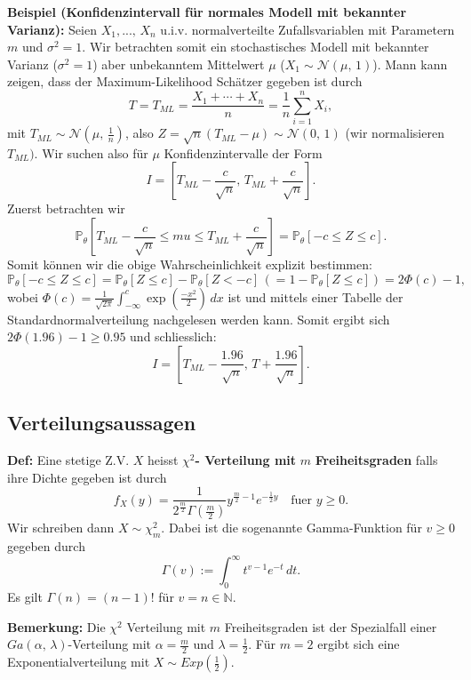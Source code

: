 \documentclass[a4paper]{extarticle}
\begin{document}
\begin{ebox}
    \textbf{Beispiel (Konfidenzintervall für normales Modell mit bekannter Varianz):} Seien $X_1,..., \, X_n$ u.i.v. normalverteilte Zufallsvariablen mit Parametern $m$ und $\sigma^2 = 1.$ Wir betrachten somit ein stochastisches Modell mit bekannter Varianz ($\sigma^2 = 1$) aber unbekanntem Mittelwert $\mu$ ($X_1 \sim \mathcal{N}(\mu, \, 1)$). Mann kann zeigen, dass der Maximum-Likelihood Schätzer gegeben ist durch
    \[
        T = T_{ML} = \frac{X_1 + \cdots + X_n}{n} = \frac{1}{n} \sum_{i = 1}^n X_i,
    \]
    mit $T_{ML} \sim \mathcal{N} (\mu, \, \frac{1}{n})$, also $Z = \sqrt{n}(T_{ML} - \mu) \sim \mathcal{N}(0, \, 1)$ (wir normalisieren $T_{ML})$. Wir suchen also für $\mu$ Konfidenzintervalle der Form
    \[
        I = [T_{ML} - \frac{c}{\sqrt{n}}, \, T_{ML} + \frac{c}{\sqrt{n}}].
    \]
    Zuerst betrachten wir
    \[
        \mathbb{P}_{\theta}[T_{ML} - \frac{c}{\sqrt{n}} \leq mu \leq T_{ML} + \frac{c}{\sqrt{n}}] = \mathbb{P}_{\theta}[-c \leq Z \leq c].
    \]
    Somit können wir die obige Wahrscheinlichkeit explizit bestimmen:
    \[
        \mathbb{P}_{\theta}[-c \leq Z \leq c] = \mathbb{P}_{\theta}[Z \leq c] - \mathbb{P}_{\theta}[Z < -c] \, (= 1 - \mathbb{P}_{\theta}[Z \leq c]) = 2 \Phi(c) - 1,
    \]
    wobei $\Phi(c) = \frac{1}{\sqrt{2 \pi}}\int_{- \infty}^c \exp(\frac{-x^2}{2}) \, dx$ ist und mittels einer Tabelle der Standardnormalverteilung nachgelesen werden kann. Somit ergibt sich $2 \Phi(1.96) - 1 \geq 0.95$ und schliesslich:
    \[
        I = [T_{ML} - \frac{1.96}{\sqrt{n}}, \, T + \frac{1.96}{\sqrt{n}}].
    \]
\end{ebox}

\subsection{Verteilungsaussagen}

\textbf{Def:} Eine stetige Z.V. $X$ heisst $\chi^2$\textbf{- Verteilung mit} $m$ \textbf{Freiheitsgraden} falls ihre Dichte gegeben ist durch
\[
    f_X(y) = \frac{1}{2^{\frac{m}{2}}\Gamma(\frac{m}{2})}y^{\frac{m}{2} - 1}e^{- \frac{1}{2}y} \quad \text{fuer } y \geq 0.
\]
Wir schreiben dann $X \sim \chi^2_m$. Dabei ist die sogenannte Gamma-Funktion für $v \geq 0$ gegeben durch
\[
    \Gamma(v) := \int_0^{\infty} t^{v - 1}e^{-t} \, dt.
\]
Es gilt $\Gamma(n) = (n - 1)!$ für $v = n \in \mathbb{N}$.

\textbf{Bemerkung:} Die $\chi^2$ Verteilung mit $m$ Freiheitsgraden ist der Spezialfall einer $Ga(\alpha, \, \lambda)$-Verteilung mit $\alpha = \frac{m}{2}$ und $\lambda = \frac{1}{2}$. Für $m = 2$ ergibt sich eine Exponentialverteilung mit $X \sim Exp(\frac{1}{2})$.
\end{document}
